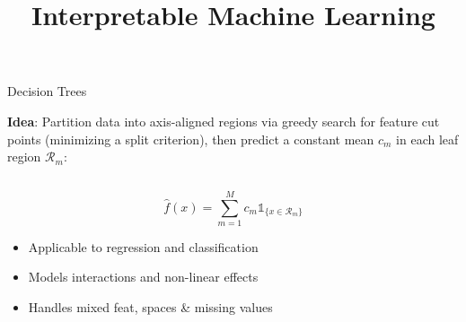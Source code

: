 \documentclass[10pt,compress,t,notes=noshow, xcolor=table]{beamer}
\title{Interpretable Machine Learning}
\date{}
\begin{document}
\titlemeta{
Interpretable Models 1
}{
Rule-based Models
}{
figure/tree_surface2.png
}{
\item Decision trees
\item RuleFit
\item Decision rules
}

\begin{frame}{Decision Trees }


\textbf{Idea}: 
Partition data into axis-aligned regions via greedy search for feature cut points (minimizing a split criterion), then predict a constant mean $c_m$ in each leaf region $\mathcal{R}_m$:

\begin{columns}[T, totalwidth=\textwidth]

\begin{column}{0.65\textwidth}
$$
\textstyle\hat f(x) = \sum\limits_{m=1}^M c_m \mathds{1}_{\{x \in \mathcal{R}_m\}}
$$

\pause
\begin{itemize}
    \item Applicable to regression and classification
    \item Models interactions and non-linear effects
    \item Handles mixed feat, spaces \& missing values
\end{itemize}


\end{column}
\end{columns}
\end{frame}
\end{document}
